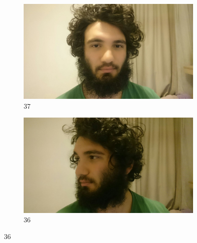 \documentclass[conference,compsoc]{IEEEtran}
\begin{document}
\begin{figure}[h!]
  \centering
  \begin{subfigure}[b]{0.4\linewidth}
    \includegraphics[width=\linewidth]{11.jpeg}
    \caption{37}
  \end{subfigure}
  \begin{subfigure}[b]{0.4\linewidth}
    \includegraphics[width=\linewidth]{22.jpeg}
    \caption{36}
  \end{subfigure}


\end{figure}
\end{document}
